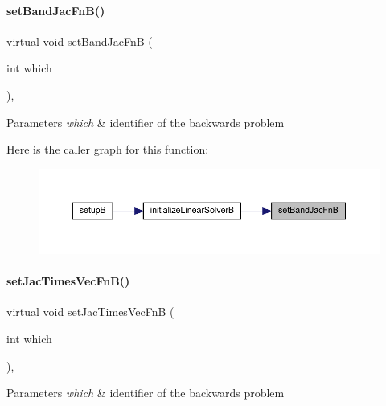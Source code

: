 \paragraph{\texorpdfstring{setBandJacFnB()}{setBandJacFnB()}}
{\footnotesize\ttfamily virtual void set\+Band\+Jac\+FnB (\begin{DoxyParamCaption}\item[{int}]{which }\end{DoxyParamCaption})\hspace{0.3cm}{\ttfamily [protected]}, {}}


\begin{DoxyParams}{Parameters}
{\em which} & identifier of the backwards problem \\
\hline
\end{DoxyParams}
Here is the caller graph for this function\+:
\nopagebreak
\begin{figure}[H]
\begin{center}
\leavevmode
\includegraphics[width=350pt]{classamici_1_1_solver_a1040308561e87b1e2d24c3ab9581e14d_icgraph}
\end{center}
\end{figure}
\mbox{\label{classamici_1_1_solver_a2c30d06de7f3f5f452dc80d5f03db9d7}} 
\paragraph{\texorpdfstring{setJacTimesVecFnB()}{setJacTimesVecFnB()}}
{\footnotesize\ttfamily virtual void set\+Jac\+Times\+Vec\+FnB (\begin{DoxyParamCaption}\item[{int}]{which }\end{DoxyParamCaption})\hspace{0.3cm}{\ttfamily [protected]}, {}}


\begin{DoxyParams}{Parameters}
{\em which} & identifier of the backwards problem \\
\hline
\end{DoxyParams}
\mbox{\label{classamici_1_1_solver_a0040ff50d302fddc63a175cbb773d21e}} 
